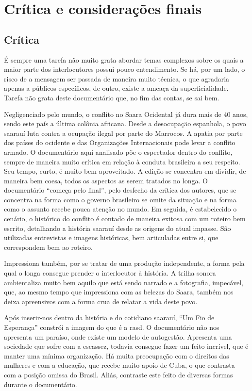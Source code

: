	\chapter{Crítica e considerações finais} \label{cap:final}
	
	\section{Crítica} \label{sec:critica}
	
	É sempre uma tarefa não muito grata  abordar temas complexos sobre os quais a maior parte dos interlocutores possui pouco entendimento. Se há, por um lado, o risco de a mensagem ser passada de maneira muito técnica, o que agradaria apenas a públicos específicos, de outro, existe a ameaça da superficialidade. Tarefa não grata deste documentário que, no fim das contas, se sai bem.
	
	Negligenciado pelo mundo, o conflito no Saara Ocidental já dura mais de 40 anos, sendo este país a última colônia africana. Desde a desocupação espanhola, o povo saarauí luta contra a ocupação ilegal por parte do Marrocos. A apatia por parte dos países do ocidente e das Organizações Internacionais pode levar a conflito armado.
	O documentário aqui analisado põe o espectador dentro do conflito, sempre de maneira muito crítica em relação à conduta brasileira a seu respeito. Seu tempo, curto, é muito bem aproveitado. A edição se concentra em dividir, de maneira bem coesa, todos os aspectos as serem tratados no longa. O documentário ``começa pelo final'', pelo desfecho da crítica dos autores, que se concentra na forma como o governo brasileiro se omite da situação e na forma como o assunto recebe pouca atenção no mundo. Em seguida, é estabelecido o cenário, o histórico do conflito é contado de maneira exitosa  com um roteiro bem escrito, detalhando a história saarauí desde as origens do atual impasse. São utilizadas entrevistas e imagens históricas, bem articuladas entre si, que correspondem bem ao roteiro.
	
	Impressiona também, por se tratar de uma produção independente, a forma pela qual o longa consegue prender o interlocutor à história. A trilha sonora ambientaliza muito bem aquilo que está sendo narrado e a fotografia, impecável, que, ao mesmo tempo que impressiona com as belezas do Saara, também nos deixa apreensivos com a forma crua de relatar a vida deste povo. 
	
	Após inserir-nos dentro da história e do cotidiano saarauí, ``Um Fio de Esperança'' constrói a imagem do que é a \glsdesc{rasd}. O documentário não nos apresenta um paraíso, onde existe um modelo de autogestão. Apresenta uma sociedade que sofre com a escassez, todavia consegue fazer um feito incrível, que é manter uma mínima organização. Há muita preocupação com o direitos das mulheres e com a educação, que recebe muito apoio de Cuba, o que contrasta com a posição omissa do Brasil. Aliás, contraste este feito de diversas formas durante o documentário.
	
